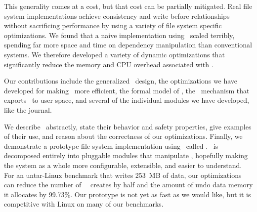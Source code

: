 \begin{comment}
The \Kudos\ storage system implementation is decomposed entirely into
 pluggable \modules\ that manipulate \patches, hopefully making the system
 as a whole more configurable, extensible, and easier to understand.
%
Any storage system \module\ can generate \patches; other modules can examine
 them and modify them when required.
%
\Patch\ dependencies are obeyed by all other storage system layers, allowing
 them to be passed through layers such as loopback block devices.
%
As a result, the loosely-coupled \modules\ that implement a file system
 can cooperate to enforce strong and often complex consistency guarantees,
 even though each \module\ only does a small part of the work.
\end{comment}


This generality comes at a cost, but that cost can be partially mitigated.
%
Real file system implementations achieve consistency and write before
 relationships without sacrificing performance by using a variety of file
 system specific optimizations.
%
We found that a naive implementation using \patches\ scaled terribly,
 spending far more space and time on dependency manipulation than
 conventional systems.
%
We therefore developed a variety of dynamic optimizations that
 significantly reduce the memory and CPU overhead associated with \patches.


Our contributions include the generalized \patch\ design, the
 optimizations we have developed for making \patches\ more efficient,
 the formal model of \patches, the \patchgroup\ mechanism that exports
 \patches\ to user space, and several of the individual modules we
 have developed, like the journal.


We describe \patches\ abstractly, state their behavior and safety
 properties, give examples of their use, and reason about the
 correctness of our optimizations.
%
Finally, we demonstrate a prototype file system implementation using
 \patches\ called \Kudos.
%
\Kudos\ is decomposed entirely into pluggable modules that manipulate
 \patches, hopefully making the system as a whole more configurable,
 extensible, and easier to understand.
%
For an untar-Linux benchmark that writes 253~MB of data, our optimizations
 can reduce the number of \patches\ \Kudos\ creates by half and the amount of
 undo data memory it allocates by 99.73\%. 
%
Our prototype is not yet as fast as we would like, but it is competitive
 with Linux on many of our benchmarks.
